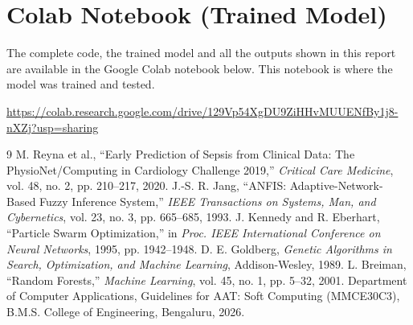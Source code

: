 \documentclass[11pt,a4paper]{article}
\begin{document}
\section{Colab Notebook (Trained Model)}
The complete code, the trained model and all the outputs shown in this report are available in the Google Colab notebook below. This notebook is where the model was trained and tested.

\url{https://colab.research.google.com/drive/129Vp54XgDU9ZiHHvMUUENfBy1j8-nXZj?usp=sharing}

\begin{thebibliography}{9}
 M. Reyna et al., ``Early Prediction of Sepsis from Clinical Data: The PhysioNet/Computing in Cardiology Challenge 2019,'' \emph{Critical Care Medicine}, vol. 48, no. 2, pp. 210--217, 2020.
 J.-S. R. Jang, ``ANFIS: Adaptive-Network-Based Fuzzy Inference System,'' \emph{IEEE Transactions on Systems, Man, and Cybernetics}, vol. 23, no. 3, pp. 665--685, 1993.
 J. Kennedy and R. Eberhart, ``Particle Swarm Optimization,'' in \emph{Proc. IEEE International Conference on Neural Networks}, 1995, pp. 1942--1948.
 D. E. Goldberg, \emph{Genetic Algorithms in Search, Optimization, and Machine Learning}, Addison-Wesley, 1989.
 L. Breiman, ``Random Forests,'' \emph{Machine Learning}, vol. 45, no. 1, pp. 5--32, 2001.
 Department of Computer Applications, Guidelines for AAT: Soft Computing (MMCE30C3), B.M.S. College of Engineering, Bengaluru, 2026.
\end{thebibliography}
\end{document}
